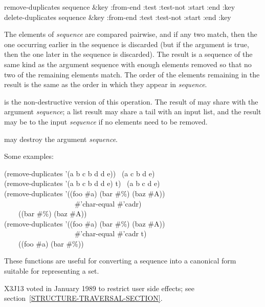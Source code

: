 \begin{defun}[Function]
remove-duplicates sequence &key :from-end :test :test-not :start :end :key \\
delete-duplicates sequence &key :from-end :test :test-not :start :end :key

The elements of {\it sequence} are compared pairwise, and if any two match,
then the one occurring earlier in the sequence
is discarded (but if the  argument is true, then the one
later in the sequence is discarded).
The result is a sequence of the same kind as the
argument sequence with enough elements removed so that no two of the remaining
elements match.  The order of the elements remaining in the result
is the same as the order in which they appear in {\it sequence}.

 is the non-destructive version
of this operation.
The result of  may share
with the argument {\it sequence}; a list result may share a tail
with an input list, and the result may be  to the input {\it sequence}
if no elements need to be removed.

 may destroy the argument {\it sequence}.

Some examples:
\begin{lisp}
(remove-duplicates '(a b c b d d e)) \EV\ (a c b d e) \\
(remove-duplicates '(a b c b d d e)  t) \EV\ (a b c d e) \\
(remove-duplicates '((foo \#{\Xbackslash}a) (bar \#{\Xbackslash}\%) (baz \#{\Xbackslash}A)) \\
~~~~~~~~~~~~~~~~~~~ \#'char-equal  \#'cadr) \\
~~~\EV\ ((bar \#{\Xbackslash}\%) (baz \#{\Xbackslash}A)) \\
(remove-duplicates '((foo \#{\Xbackslash}a) (bar \#{\Xbackslash}\%) (baz \#{\Xbackslash}A)) \\
~~~~~~~~~~~~~~~~~~~ \#'char-equal  \#'cadr  t) \\
~~~\EV\ ((foo \#{\Xbackslash}a) (bar \#{\Xbackslash}\%))
\end{lisp}

These functions are useful for converting a sequence into a canonical
form suitable for representing a set.

\begin{new}
X3J13 voted in January 1989
to restrict user side effects; see section~\ref{STRUCTURE-TRAVERSAL-SECTION}.
\end{new}


\end{defun}
